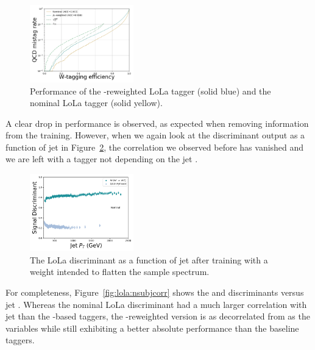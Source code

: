 \begin{figure}[h!]
\centering
\includegraphics[width=0.4\textwidth]{figures/vtagging/AN-18-099/training/lolaptrew.png}
\caption{Performance of the \PT-reweighted LoLa tagger (solid blue) and the nominal LoLa tagger (solid yellow).}
\label{fig:lola:rocptweighted}
\end{figure}
A clear drop in performance is observed, as expected when removing information from the training. However, when we again look at the discriminant output as a function of jet \PT in Figure~\ref{fig:lola:ptweightedcorr}, the correlation we observed before has vanished and we are left with a tagger not depending on the jet \PT.
\begin{figure}[h!]
\centering
\includegraphics[width=0.4\textwidth]{figures/vtagging/lola/wLola_v6_Weighted_withM_withPT-profile-jpt.png}
\caption{The LoLa discriminant as a function of jet \PT after training with a weight intended to flatten the sample \PT spectrum.}
\label{fig:lola:ptweightedcorr}
\end{figure}
For completeness, Figure~\ref{fig:lola:nsubjcorr} shows the \nsubj and \ddt discriminants versus jet \PT. Whereas the nominal LoLa discriminant had a much larger correlation with jet \PT than the \nsubj-based taggers, the \PT-reweighted version is as decorrelated from \PT as the \nsubj variables while still exhibiting a better absolute performance than the baseline taggers.

